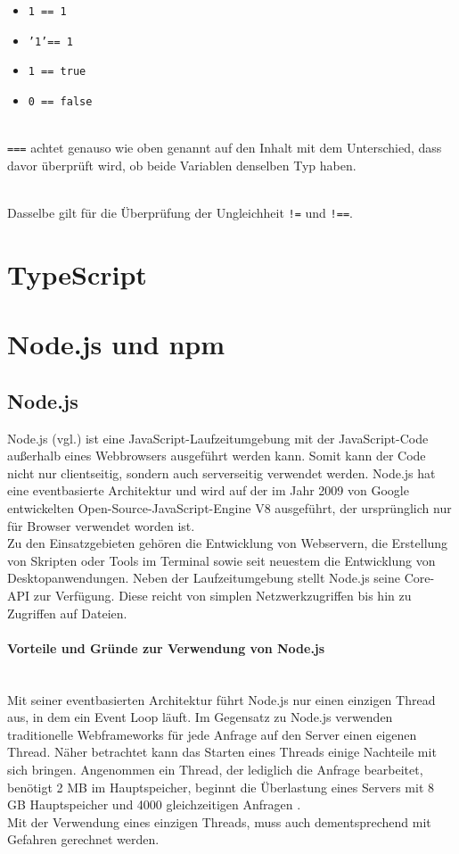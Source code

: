 \begin{itemize}
	\item \texttt{1 == 1}
	\item \texttt{'1'== 1}
	\item \texttt{1 == true}
	\item \texttt{0 == false}
\end{itemize}

\mbox{}\\
\texttt{===} achtet genauso wie oben genannt auf den Inhalt mit dem Unterschied, dass davor überprüft wird, ob beide Variablen denselben Typ haben.

\mbox{}\\
Dasselbe gilt für die Überprüfung der Ungleichheit \texttt{!=} und \texttt{!==}.

\section{TypeScript}

\section{Node.js und npm}

\subsection{Node.js}
Node.js (vgl.\cite{nodejs_2021}) ist eine JavaScript-Laufzeitumgebung mit der JavaScript-Code außerhalb eines Webbrowsers ausgeführt werden kann. Somit kann der Code nicht nur clientseitig, sondern auch serverseitig verwendet werden. Node.js hat eine eventbasierte Architektur und wird auf der im Jahr 2009 von Google entwickelten Open-Source-JavaScript-Engine V8 ausgeführt, der ursprünglich nur für Browser verwendet worden ist.\\
Zu den Einsatzgebieten gehören die Entwicklung von Webservern, die Erstellung von Skripten oder Tools im Terminal sowie seit neuestem die Entwicklung von Desktopanwendungen. Neben der Laufzeitumgebung stellt Node.js seine Core-API zur Verfügung. Diese reicht von simplen Netzwerkzugriffen bis hin zu Zugriffen auf Dateien.

\paragraph{Vorteile und Gründe zur Verwendung von Node.js}
\mbox{}\\
Mit seiner eventbasierten Architektur führt Node.js nur einen einzigen Thread aus, in dem ein Event Loop läuft. Im Gegensatz zu Node.js verwenden traditionelle Webframeworks für jede Anfrage auf den Server einen eigenen Thread. Näher betrachtet kann das Starten eines Threads einige Nachteile mit sich bringen. Angenommen ein Thread, der lediglich die Anfrage bearbeitet, benötigt 2 MB im Hauptspeicher, beginnt die Überlastung eines Servers mit 8 GB Hauptspeicher und 4000 gleichzeitigen Anfragen \cite{nodejs_blogpost_2012}.\\
Mit der Verwendung eines einzigen Threads, muss auch dementsprechend mit Gefahren gerechnet werden.

